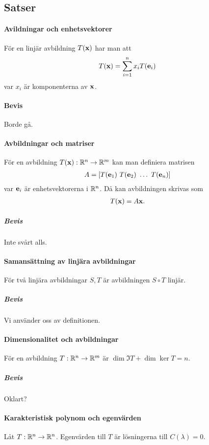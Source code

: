 \subsection{Satser}

\paragraph{Avildningar och enhetsvektorer}
För en linjär avbildning $T(\vect{x})$ har man att
\begin{align*}
	T(\vect{x}) = \sum\limits_{i = 1}^{n} x_iT(\vect{e}_i)
\end{align*}
var $x_i$ är komponenterna av $\vect{x}$.

\paragraph{Bevis}
Borde gå.

\paragraph{Avbildningar och matriser}
För en avbildning $T(\vect{x}): \R^n\to\R^m$ kan man definiera matrisen
\begin{align*}
	A = \left[ T(\vect{e}_1) ~ T(\vect{e}_2) ~ \dots ~ T(\vect{e}_n) \right]
\end{align*}
var $\vect{e}_i$ är enhetsvektorerna i $\mathbb{R}^n$. Då kan avbildningen skrivas som
\begin{align*}
	T(\vect{x}) = A\vect{x}.
\end{align*}

\subparagraph{Bevis}
Inte svårt alls.

\paragraph{Samansättning av linjära avbildningar}
För två linjära avbildningar $S, T$ är avbildningen $S\circ T$ linjär.

\subparagraph{Bevis}
Vi använder oss av definitionen.

\paragraph{Dimensionalitet och avbildningar}
För en avbildning $T: \mathbb{R}^n\to\mathbb{R}^m$ är $\dim{\Im T} + \dim{\ker{T}} = n$.

\subparagraph{Bevis}
Oklart?

\paragraph{Karakteristisk polynom och egenvärden}
Låt $T:\mathbb{R}^n\to\mathbb{R}^n$. Egenvärden till $T$ är lösningerna till $C(\lambda) = 0$.

